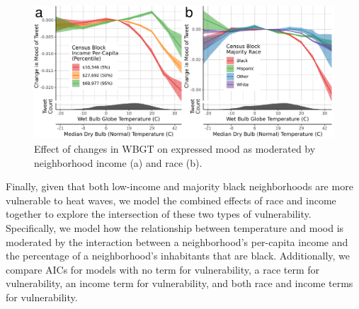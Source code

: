 \documentclass[fleqn,10pt]{wlscirep}
\begin{document}
\begin{figure}[H]
\centering
 \includegraphics[width=\linewidth]{../res/wbgt_combined.png}
 \caption{Effect of changes in WBGT on expressed mood as moderated by neighborhood income (a) and race (b).}
\label{fig:hetero}
\end{figure}

Finally, given that both low-income and majority black neighborhoods are more vulnerable to heat waves, we model the combined effects of race and income together to explore the intersection of these two types of vulnerability. Specifically, we model how the relationship between temperature and mood is moderated by the interaction between a neighborhood's per-capita income and the percentage of a neighborhood's inhabitants that are black. Additionally, we compare AICs for models with no term for vulnerability, a race term for vulnerability, an income term for vulnerability, and both race and income terms for vulnerability.
\end{document}
